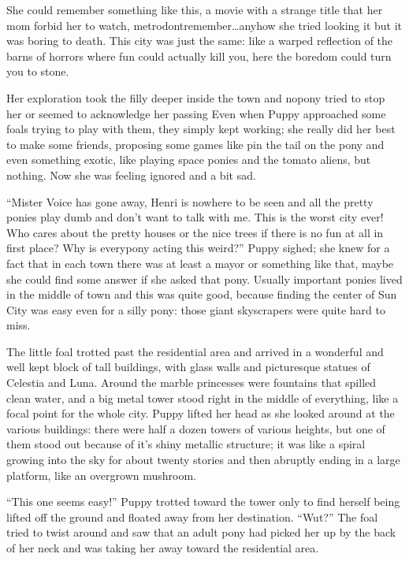 She could remember something like this, a movie with a strange title that her mom forbid her to watch, metrodontremember\dots anyhow she tried looking it but it was boring to death. This city was just the same: like a warped reflection of the barns of horrors where fun could actually kill you, here the boredom could turn you to stone.

Her exploration took the filly deeper inside the town and nopony tried to stop her or seemed to acknowledge her passing Even when Puppy approached some foals trying to play with them, they simply kept working; she really did her best to make some friends, proposing some games like pin the tail on the pony and even something exotic, like playing space ponies and the tomato aliens, but nothing. Now she was feeling ignored and a bit sad.

``Mister Voice has gone away, Henri is nowhere to be seen and all the pretty ponies play dumb and don't want to talk with me. This is the worst city ever! Who cares about the pretty houses or the nice trees if there is no fun at all in first place? Why is everypony acting this weird?'' Puppy sighed; she knew for a fact that in each town there was at least a mayor or something like that, maybe she could find some answer if she asked that pony. Usually important ponies lived in the middle of town and this was quite good, because finding the center of Sun City was easy even for a silly pony: those giant skyscrapers were quite hard to miss.

The little foal trotted past the residential area and arrived in a wonderful and well kept block of tall buildings, with glass walls and picturesque statues of Celestia and Luna. Around the marble princesses were fountains that spilled clean water, and a big metal tower stood right in the middle of everything, like a focal point for the whole city. Puppy lifted her head as she looked around at the various buildings: there were half a dozen towers of various heights, but one of them stood out because of it's shiny metallic structure; it was like a spiral growing into the sky for about twenty stories and then abruptly ending in a large platform, like an overgrown mushroom.

``This one seems easy!'' Puppy trotted toward the tower only to find herself being lifted off the ground and floated away from her destination. ``Wut?'' The foal tried to twist around and saw that an adult pony had picked her up by the back of her neck and was taking her away toward the residential area.

